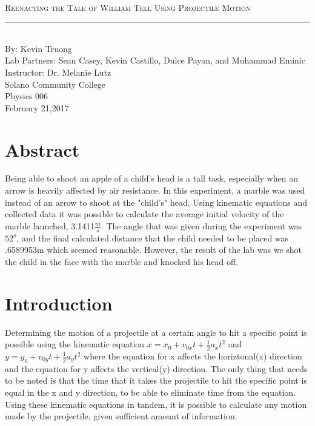 \documentclass[aps,letterpaper,11pt]{revtex4}
\newcommand{\labno}{4}
\newcommand{\labtitle}{Reenacting the Tale of William Tell Using Projectile Motion}
\newcommand{\authorname}{Kevin Truong}
\newcommand{\professor}{Dr. Melanie Lutz}
\newcommand{\classno}{Physics 006}
\newcommand{\labpartners}{Sean Casey, Kevin Castillo, Dulce Payan, and Muhammad Eminic}
\newcommand{\submitdate}{February 21,2017}
\begin{document}
\begin{titlepage}
\begin{center}
\hspace{-136mm}\boxed{{\Large \textsc{Lab No. \labno}}}\\\vspace{30mm}
{\Large \textsc{\labtitle} \\ \vspace{4pt}}
\rule[13pt]{\textwidth}{1pt}\\ \vspace{150pt}
{\large By: \authorname \\ \vspace{10pt}}
Lab Partners: \labpartners \\
Instructor: \professor \vspace{10pt} \\
Solano Community College\\ \classno \\ \vspace{10pt}
\submitdate
\end{center}
\end{titlepage}

\section{Abstract}

 Being able to shoot an apple of a child's head is a tall task, especially when an arrow is heavily affected by air resistance. In this experiment, a marble was used instead of an arrow to shoot at the "child's" head. Using kinematic equations and collected data it was possible to calculate the average initial velocity of the marble launched, 3.1411$\frac{m}{s}$. The angle that was given during the experiment was $52^o$, and the final calculated distance that the child needed to be placed was .6589953m which seemed reasonable. However, the result of the lab was we shot the child in the face with the marble and knocked his head off. 

\section{Introduction}

Determining the motion of a projectile at a certain angle to hit a specific point is possible using the kinematic equation  $x = x_0+v_{0x}t+\frac{1}{2}a_xt^2$ and $y = y_0+v_{0y}t+\frac{1}{2}a_yt^2$ where the equation for x affects the horiztonal(x) direction and the equation for y affects the vertical(y) direction. The only thing that needs to be noted is that the time that it takes the projectile to hit the specific point is equal in the x and y direction, to be able to eliminate time from the equation. Using these kinematic equations in tandem, it is possible to calculate any motion made by the projectile, given sufficient amount of information. 
\end{document}
